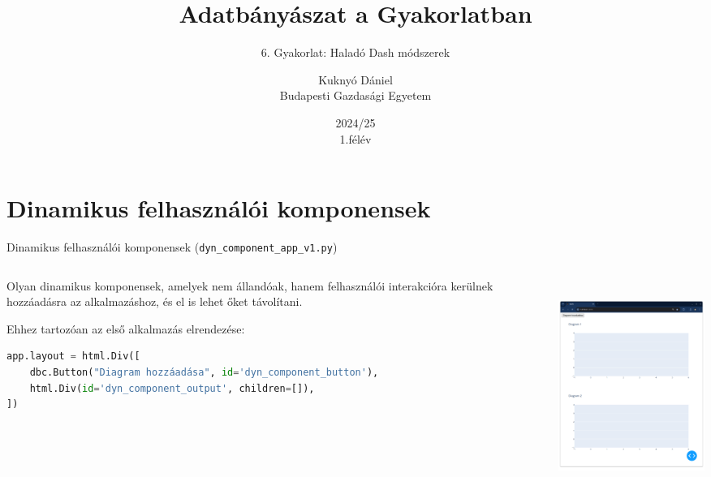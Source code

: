 \documentclass[english, aspectratio=169]{beamer}
\makeatletter
\newcommand\makebeamertitle{\frame{\maketitle}}
\let\origtableofcontents=\tableofcontents
\def\tableofcontents{\@ifnextchar[{\origtableofcontents}{\gobbletableofcontents}}
\def\gobbletableofcontents#1{\origtableofcontents}
\makeatother
\begin{document}
\section{Dinamikus felhasználói komponensek}
\title[]{Adatbányászat a Gyakorlatban}
\subtitle{6. Gyakorlat: Haladó Dash módszerek}
\author[Kuknyó Dániel]{Kuknyó Dániel\\Budapesti Gazdasági Egyetem}
\date{2024/25\\1.félév}
\makebeamertitle

\begin{frame}
\tableofcontents{}
\end{frame}

\begin{frame}
\tableofcontents[currentsection]
\end{frame}

\begin{frame}[fragile]{Dinamikus felhasználói komponensek (\texttt{dyn\_component\_app\_v1.py})}
	\begin{columns}
		\begin{column}{.5\textwidth}
			Olyan dinamikus komponensek, amelyek nem állandóak, hanem felhasználói interakcióra kerülnek hozzáadásra az alkalmazáshoz, és el is lehet őket távolítani.\par\smallskip
			Ehhez tartozóan az első alkalmazás elrendezése:\par\smallskip
			\begin{lstlisting}[language=python]
app.layout = html.Div([
	dbc.Button("Diagram hozzáadása", id='dyn_component_button'),
	html.Div(id='dyn_component_output', children=[]),
])
			\end{lstlisting}
		\end{column}
		\begin{column}{.5\textwidth}
			\begin{center}
				\includegraphics[width=7cm, height=7cm, keepaspectratio]{images/adv_1.png}
			\end{center}
		\end{column}
	\end{columns}
\end{frame}
\end{document}
